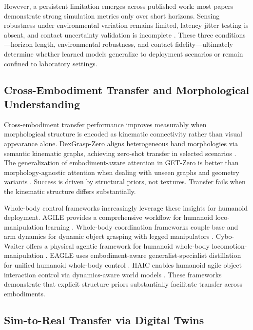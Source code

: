 \documentclass[12pt,a4paper,oneside]{report}
\begin{document}
However, a persistent limitation emerges across published work: most papers demonstrate strong simulation metrics only over short horizons. Sensing robustness under environmental variation remains limited, latency jitter testing is absent, and contact uncertainty validation is incomplete \cite{lou2024robogs, pan2025selfcorrecting}. These three conditions—horizon length, environmental robustness, and contact fidelity—ultimately determine whether learned models generalize to deployment scenarios or remain confined to laboratory settings.

\subsection{Cross-Embodiment Transfer and Morphological Understanding}

Cross-embodiment transfer performance improves measurably when morphological structure is encoded as kinematic connectivity rather than visual appearance alone. DexGrasp-Zero aligns heterogeneous hand morphologies via semantic kinematic graphs, achieving zero-shot transfer in selected scenarios \cite{wu2025dexgrasp}. The generalization of embodiment-aware attention in GET-Zero is better than morphology-agnostic attention when dealing with unseen graphs and geometry variants \cite{patel2024getzero}. Success is driven by structural priors, not textures. Transfer fails when the kinematic structure differs substantially.

Whole-body control frameworks increasingly leverage these insights for humanoid deployment. AGILE provides a comprehensive workflow for humanoid loco-manipulation learning \cite{zhao2026agile}. Whole-body coordination frameworks couple base and arm dynamics for dynamic object grasping with legged manipulators \cite{liang2025wholebody}. Cybo-Waiter offers a physical agentic framework for humanoid whole-body locomotion-manipulation \cite{ren2026cybowaiter}. EAGLE uses embodiment-aware generalist-specialist distillation for unified humanoid whole-body control \cite{peng2026eagle}. HAIC enables humanoid agile object interaction control via dynamics-aware world models \cite{li2026haic}. These frameworks demonstrate that explicit structure priors substantially facilitate transfer across embodiments.

\subsection{Sim-to-Real Transfer via Digital Twins}
\end{document}
